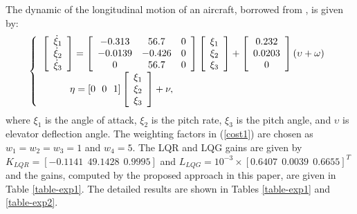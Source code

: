 \documentclass{amsart}
\numberwithin{equation}{section}
\def\myparagraph#1{{\smallskip\noindent{\bf #1}}}
\begin{document}
\myparagraph{Pitch control}
The dynamic of the longitudinal motion of an aircraft, borrowed from \cite{cmu_examples}, is given by:
\begin{align}
\nonumber
\left\{\begin{array}{l}\left[{\begin{array}{c}
\dot\xi_1\\
\dot\xi_2\\
\dot\xi_3\\
 \end{array}}\right]=\left[ {\begin{array}{ccc}
-0.313&56.7&0\\
-0.0139&-0.426&0\\
0&56.7&0\\
 \end{array}}\right]\left[{\begin{array}{c}
\xi_1\\
\xi_2\\
\xi_3\\
 \end{array}}\right]+\left[ {\begin{array}{c}
0.232\\ 0.0203\\ 0\\
 \end{array}}\right]\left(\upsilon+\omega\right)\\\hspace{10mm}\eta=[0~~0~~1]\left[{\begin{array}{c}
\xi_1\\
\xi_2\\
\xi_3\\
 \end{array}}\right]+\nu,\end{array}\right. 
\end{align}
where $\xi_1$ is the angle of attack, $\xi_2$ is the pitch rate, $\xi_3$ is the pitch angle, and $\upsilon$ is elevator deflection angle. The weighting factors in (\ref{cost1}) are chosen as $w_1=w_2=w_3=1$ and $w_4=5$. The LQR and LQG gains are given by $K_{LQR}=[-0.1141~~49.1428~~0.9995]$ and $L_{LQG}=10^{-3}\times[0.6407~~0.0039~~0.6655]^T$ and the gains, computed by the proposed approach in this paper, are given in Table \ref{table-exp1}. The detailed results are shown in Tables \ref{table-exp1} and \ref{table-exp2}. 
\end{document}
